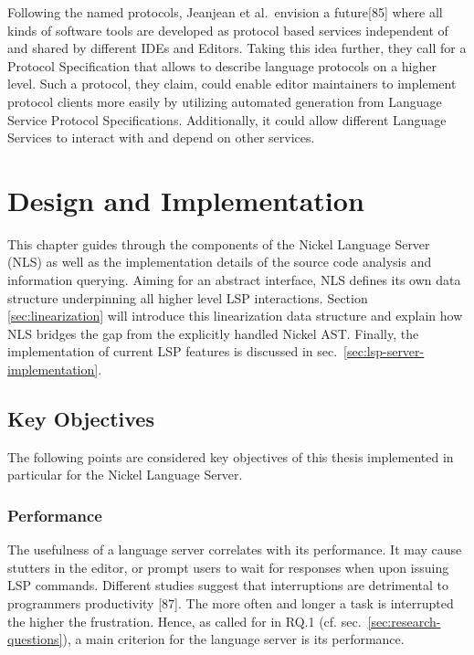 \documentclass[
  a4paper,
  bibtex,
  english,
  nomenclature]{kthlatex/kththesis/kththesis}
\begin{document}
Following the named protocols, Jeanjean et al.~envision a future{[}85{]}
where all kinds of software tools are developed as protocol based
services independent of and shared by different IDEs and Editors. Taking
this idea further, they call for a Protocol Specification that allows to
describe language protocols on a higher level. Such a protocol, they
claim, could enable editor maintainers to implement protocol clients
more easily by utilizing automated generation from Language Service
Protocol Specifications. Additionally, it could allow different Language
Services to interact with and depend on other services.

\hypertarget{sec:design-and-implementation}{%
\chapter{Design and
Implementation}\label{sec:design-and-implementation}}

This chapter guides through the components of the Nickel Language Server
(NLS) as well as the implementation details of the source code analysis
and information querying. Aiming for an abstract interface, NLS defines
its own data structure underpinning all higher level LSP interactions.
Section \ref{sec:linearization} will introduce this linearization data
structure and explain how NLS bridges the gap from the explicitly
handled Nickel AST. Finally, the implementation of current LSP features
is discussed in sec.~\ref{sec:lsp-server-implementation}.

\hypertarget{sec:key-objectives}{%
\section{Key Objectives}\label{sec:key-objectives}}

The following points are considered key objectives of this thesis
implemented in particular for the Nickel Language Server.

\hypertarget{sec:performance}{%
\subsection{Performance}\label{sec:performance}}

The usefulness of a language server correlates with its performance. It
may cause stutters in the editor, or prompt users to wait for responses
when upon issuing LSP commands. Different studies suggest that
interruptions are detrimental to programmers productivity {[}87{]}. The
more often and longer a task is interrupted the higher the frustration.
Hence, as called for in RQ.1 (cf. sec.~\ref{sec:research-questions}), a
main criterion for the language server is its performance.
\end{document}
